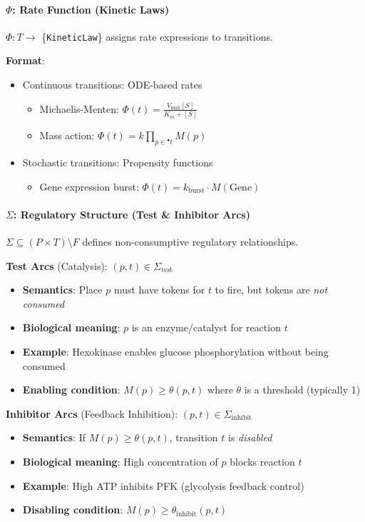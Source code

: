 \paragraph{$\Phi$: Rate Function (Kinetic Laws)}
$\Phi: T \to$ \{\texttt{KineticLaw}\} assigns rate expressions to transitions.

\noindent\textbf{Format}:
\begin{itemize}
    \item Continuous transitions: ODE-based rates
        \begin{itemize}
            \item Michaelis-Menten: $\Phi(t) = \frac{V_{\max} [S]}{K_m + [S]}$
            \item Mass action: $\Phi(t) = k \prod_{p \in {}^\bullet t} M(p)$
        \end{itemize}
    \item Stochastic transitions: Propensity functions
        \begin{itemize}
            \item Gene expression burst: $\Phi(t) = k_{\text{burst}} \cdot M(\text{Gene})$
        \end{itemize}
\end{itemize}

\paragraph{$\Sigma$: Regulatory Structure (Test \& Inhibitor Arcs)}
$\Sigma \subseteq (P \times T) \setminus F$ defines non-consumptive regulatory relationships.

\noindent\textbf{Test Arcs} (Catalysis): $(p,t) \in \Sigma_{\text{test}}$
\begin{itemize}
    \item \textbf{Semantics}: Place $p$ must have tokens for $t$ to fire, but tokens are \emph{not consumed}
    \item \textbf{Biological meaning}: $p$ is an enzyme/catalyst for reaction $t$
    \item \textbf{Example}: Hexokinase enables glucose phosphorylation without being consumed
    \item \textbf{Enabling condition}: $M(p) \geq \theta(p,t)$ where $\theta$ is a threshold (typically 1)
\end{itemize}

\noindent\textbf{Inhibitor Arcs} (Feedback Inhibition): $(p,t) \in \Sigma_{\text{inhibit}}$
\begin{itemize}
    \item \textbf{Semantics}: If $M(p) \geq \theta(p,t)$, transition $t$ is \emph{disabled}
    \item \textbf{Biological meaning}: High concentration of $p$ blocks reaction $t$
    \item \textbf{Example}: High ATP inhibits PFK (glycolysis feedback control)
    \item \textbf{Disabling condition}: $M(p) \geq \theta_{\text{inhibit}}(p,t)$
\end{itemize}

